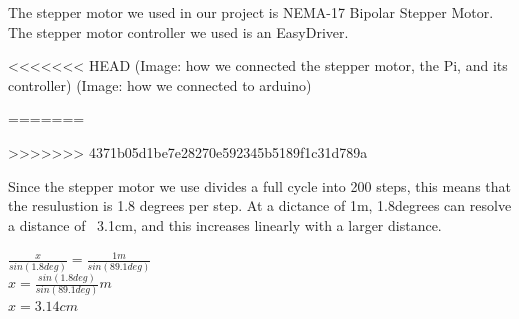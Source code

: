 The stepper motor we used in our project is NEMA-17 Bipolar Stepper Motor. \cite{steppermotor}
The stepper motor controller we used is an EasyDriver.\cite{steppercontroller}

<<<<<<< HEAD
(Image: how we connected the stepper motor, the Pi, and its controller)
(Image: how we connected to arduino)

%
=======

>>>>>>> 4371b05d1be7e28270e592345b5189f1c31d789a

Since the stepper motor we use divides a full cycle into 200 steps, this means that the resulustion is 1.8 degrees per step. At a dictance of 1m, 1.8degrees can resolve a distance of ~3.1cm, and this increases linearly with a larger distance.

$\frac{x}{sin(1.8deg)} = \frac{1m}{sin(89.1deg)}$ \\
$x = \frac{sin(1.8deg)}{sin(89.1deg)}m$ \\
$x = 3.14cm$ \\


